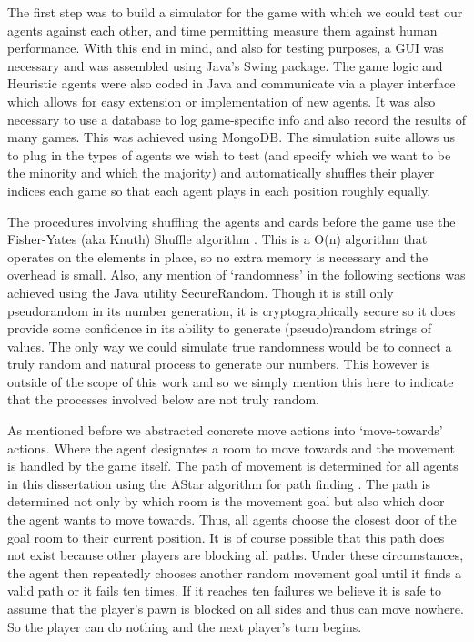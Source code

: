 \documentclass[msc, ai, logo, twoside, notimes, parskip, leftchapter, normalheadings]{infthesis}
\begin{document}
The first step was to build a simulator for the game with which we could test our agents against each other, and time permitting measure them against human performance. With this end in mind, and also for testing purposes, a GUI was necessary and was assembled using Java's Swing package. The game logic and Heuristic agents were also coded in Java and communicate via a player interface which allows for easy extension or implementation of new agents. It was also necessary to use a database to log game-specific info and also record the results of many games. This was achieved using MongoDB. The simulation suite allows us to plug in the types of agents we wish to test (and specify which we want to be the minority and which the majority) and automatically shuffles their player indices each game so that each agent plays in each position roughly equally.

The procedures involving shuffling the agents and cards before the game use the Fisher-Yates (aka Knuth) Shuffle algorithm \citep{shuffle}. This is a O(n) algorithm that operates on the elements in place, so no extra memory is necessary and the overhead is small. Also, any mention of `randomness' in the following sections was achieved using the Java utility SecureRandom. Though it is still only pseudorandom in its number generation, it is cryptographically secure so it does provide some confidence in its ability to generate (pseudo)random strings of values. The only way we could simulate true randomness would be to connect a truly random and natural process to generate our numbers. This however is outside of the scope of this work and so we simply mention this here to indicate that the processes involved below are not truly random.

As mentioned before we abstracted concrete move actions into `move-towards' actions. Where the agent designates a room to move towards and the movement is handled by the game itself. The path of movement is determined for all agents in this dissertation using the AStar algorithm for path finding \citep{Russell-norvig}. The path is determined not only by which room is the movement goal but also which door the agent wants to move towards. Thus, all agents choose the closest door of the goal room to their current position. It is of course possible that this path does not exist because other players are blocking all paths. Under these circumstances, the agent then repeatedly chooses another random movement goal until it finds a valid path or it fails ten times. If it reaches ten failures we believe it is safe to assume that the player's pawn is blocked on all sides and thus can move nowhere. So the player can do nothing and the next player's turn begins.
\end{document}
